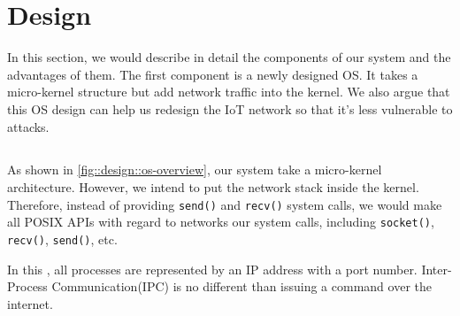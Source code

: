 \section{Design}

In this section, we would describe in detail the components of our system and the advantages of them.
The first component is a newly designed OS. 
It takes a micro-kernel structure but add network traffic into the kernel.
We also argue that this OS design can help us redesign the IoT network so that it's less vulnerable to attacks.

\subsection{\ritos}

As shown in \autoref{fig::design::os-overview}, our system take a micro-kernel architecture.
However, we intend to put the network stack inside the kernel.
Therefore, instead of providing \texttt{send()} and \texttt{recv()} system calls, we would make all POSIX APIs with regard to networks our system calls, including \texttt{socket()}, \texttt{recv()}, \texttt{send()}, etc.

In this \ritos, all processes are represented by an IP address with a port number. Inter-Process Communication(IPC) is no different than issuing a command over the internet.

